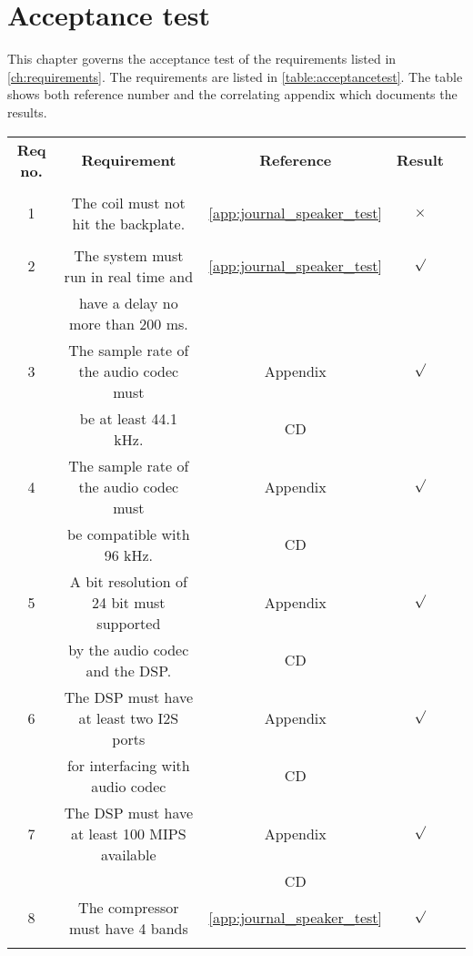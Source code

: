 \chapter{Acceptance test}

This chapter governs the acceptance test of the requirements listed in \autoref{ch:requirements}. The requirements are listed in \autoref{table:acceptancetest}. The table shows both reference number and the correlating appendix which documents the results.  

\renewcommand{\arraystretch}{0.95}
\begin{table}[H]
\centering
\begin{tabular}{|c|c|c|c|c|} \hline
\rowcolor{lightgray} \bfseries Req no. 	& \bfseries Requirement 						&  \bfseries Reference				&\bfseries Result 	\\ 
\rowcolor{lightgray}					&												&  									&		 			\\ \hline

1			& The coil must not hit the backplate. 			& \autoref{app:journal_speaker_test} 	&	$\times$ 		\\ 
 			&												& 										&	 				\\ \hline
%
2			& The system must run in real time and 			& \autoref{app:journal_speaker_test}	& 	$\surd$			\\ 
			& have a delay no more than 200 ms.				& 										&					\\ \hline
%
3			& The sample rate of the audio codec must 		& Appendix								&	$\surd$			\\ 
			& be at least 44.1 kHz. 						& 	CD									&					\\ \hline
%
4			& The sample rate of the audio codec must   	& Appendix								& 	$\surd$			\\ 
			& be compatible with 96 kHz.					&	CD									&					\\ \hline

5			&  A bit resolution of 24 bit must supported 	& Appendix								&	$\surd$			\\ 
			&  by the audio codec and the DSP. 	 	 		&	CD					 				&					\\ \hline
%
6			& The DSP must have at least two I2S ports 		& Appendix								&	$\surd$			\\ 
			& for interfacing with audio codec  			& 	CD		 					 		&					\\ \hline
%
7			& The DSP must have at least 100 MIPS available	& Appendix								&	$\surd$			\\ 
			&										  	 	&	CD					 				&					\\ \hline
%
8			& The compressor must have 4 bands 				& \autoref{app:journal_speaker_test}	&	$\surd$			\\ 
			& 												& 			 					 		&					\\ \hline


\end{tabular}
\end{table}

